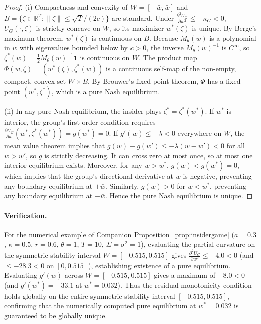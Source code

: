 \documentclass[12pt]{article}
\theoremstyle{definition}
\theoremstyle{remark}
\begin{document}
\begin{proof}
(i) Compactness and convexity of $W=[-\bar w,\bar w]$ and $B=\{\zeta\in\mathbb R^T:\|\zeta\|\le\sqrt T/(2c)\}$ are standard. Under $\frac{\partial^2 U_G}{\partial w^2}\le-\kappa_G<0$, $U_G(\cdot,\zeta)$ is strictly concave on $W$, so its maximizer $w^*(\zeta)$ is unique. By Berge's maximum theorem, $w^*(\zeta)$ is continuous on $B$. Because $M_\theta(w)$ is a polynomial in $w$ with eigenvalues bounded below by $c>0$, the inverse $M_\theta(w)^{-1}$ is $C^\infty$, so $\zeta^*(w)=\frac12 M_\theta(w)^{-1}\mathbf 1$ is continuous on $W$. The product map $\Phi(w,\zeta)=(w^*(\zeta),\zeta^*(w))$ is a continuous self-map of the non-empty, compact, convex set $W\times B$. By Brouwer's fixed-point theorem, $\Phi$ has a fixed point $(w^*,\zeta^*)$, which is a pure Nash equilibrium.

(ii) In any pure Nash equilibrium, the insider plays $\zeta^*=\zeta^*(w^*)$. If $w^*$ is interior, the group's first-order condition requires $\frac{\partial U_G}{\partial w}(w^*,\zeta^*(w^*))=g(w^*)=0$. If $g'(w)\le-\lambda<0$ everywhere on $W$, the mean value theorem implies that $g(w)-g(w')\le-\lambda(w-w')<0$ for all $w>w'$, so $g$ is strictly decreasing. It can cross zero at most once, so at most one interior equilibrium exists. Moreover, for any $w>w^*$, $g(w)<g(w^*)=0$, which implies that the group's directional derivative at $w$ is negative, preventing any boundary equilibrium at $+\bar w$. Similarly, $g(w)>0$ for $w<w^*$, preventing any boundary equilibrium at $-\bar w$. Hence the pure Nash equilibrium is unique.
\end{proof}

\paragraph{Verification.} For the numerical example of Companion Proposition~\ref{prop:insidergame} ($a=0.3$, $\kappa=0.5$, $r=0.6$, $\theta=1$, $T=10$, $\Sigma=\sigma^2=1$), evaluating the partial curvature on the symmetric stability interval $W=[-0.515,0.515]$ gives $\frac{\partial^2 U_G}{\partial w^2}\le-4.0<0$ (and $\le-28.3<0$ on $[0,0.515]$), establishing existence of a pure equilibrium. Evaluating $g'(w)$ across $W=[-0.515,0.515]$ gives a maximum of $-8.0<0$ (and $g'(w^*)=-33.1$ at $w^*=0.032$). Thus the residual monotonicity condition holds globally on the entire symmetric stability interval $[-0.515,0.515]$, confirming that the numerically computed pure equilibrium at $w^*=0.032$ is guaranteed to be globally unique.
\end{document}
